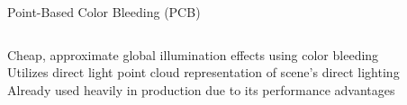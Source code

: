 \documentclass[10pt,compress,professionalfont]{beamer}
\begin{document}
\begin{frame}{Point-Based Color Bleeding (PCB)}


    \begin{columns}
        \begin{column}{0.65\textwidth}
            Cheap, approximate global illumination effects using color bleeding\\
            \vspace{8mm}
            Utilizes direct light point cloud representation of scene's direct lighting\\
            \vspace{8mm}
            Already used heavily in production due to its performance advantages


\end{column}
\end{columns}
\end{frame}
\end{document}
